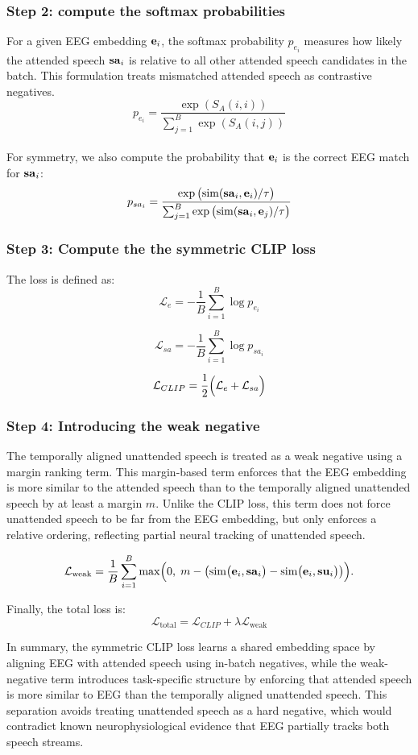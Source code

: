 \subsubsection*{Step 2: compute the softmax probabilities}
For a given EEG embedding $\mathbf{e}_i$, the softmax probability $p_{e_i}$ measures how likely the attended speech $\mathbf{sa}_i$ is relative to all other attended speech candidates in the batch. This formulation treats mismatched attended speech as contrastive negatives. 
\[
p_{e_i} =
\frac{\exp(S_A(i,i))}
{\sum_{j=1}^{B} \exp(S_A(i,j))}
\]
\\

For symmetry, we also compute the probability that $\mathbf{e}_i$ is the correct EEG match for $\mathbf{sa}_i$:
\[
p_{sa_i} =
\frac{
\exp\big(\mathrm{sim}(\mathbf{sa}_i,\mathbf{e}_i)/\tau\big)
}{
\sum_{j=1}^{B}\exp\big(\mathrm{sim}(\mathbf{sa}_i,\mathbf{e}_j)/\tau\big)
}
\]

\subsubsection*{Step 3: Compute the the symmetric CLIP loss}
The loss is defined as:
\[
\mathcal{L}_{e} =
-\frac{1}{B}\sum_{i=1}^{B}\log p_{e_i}
\]

\[
\mathcal{L}_{sa} =
-\frac{1}{B}\sum_{i=1}^{B}\log p_{sa_i}
\]

\[
\mathcal{L}_{CLIP} = \frac{1}{2}\Bigl(
\mathcal{L}_{e}+
\mathcal{L}_{sa}
\Bigr)
\]

\subsubsection*{Step 4: Introducing the weak negative}
The temporally aligned unattended speech is treated as a weak negative using a margin ranking term. This margin-based term enforces that the EEG embedding is more similar to the attended speech than to the temporally aligned unattended speech by at least a margin $m$.
Unlike the CLIP loss, this term does not force unattended speech to be far from the EEG embedding, but only enforces a relative ordering, reflecting partial neural tracking of unattended speech.

\[
\mathcal{L}_{\mathrm{weak}} =
\frac{1}{B}\sum_{i=1}^{B}
\max\Bigl(0,\;
m - \bigl(\mathrm{sim}\bigl(\mathbf{\mathbf{e}}_{i}, \mathbf{\mathbf{sa}}_{i}\bigr)-\mathrm{sim}\bigl(\mathbf{\mathbf{e}}_{i}, \mathbf{\mathbf{su}}_{i}\bigr)\bigr)
\Bigr).
\]

Finally, the total loss is:
\[
\mathcal{L}_{\mathrm{total}} =
\mathcal{L}_{CLIP}
+
\lambda \mathcal{L}_{\mathrm{weak}}
\]

In summary, the symmetric CLIP loss learns a shared embedding space by aligning EEG with attended speech using in-batch negatives, while the weak-negative term introduces task-specific structure by enforcing that attended speech is more similar to EEG than the temporally aligned unattended speech. This separation avoids treating unattended speech as a hard negative, which would contradict known neurophysiological evidence that EEG partially tracks both speech streams.

